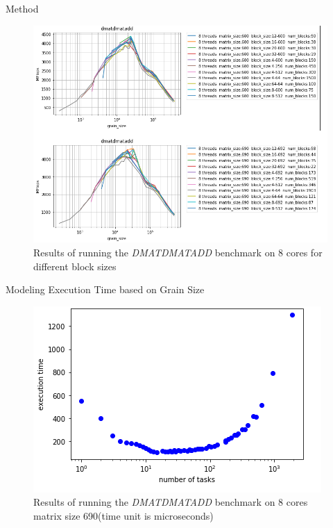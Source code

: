 \documentclass[10pt]{beamer}
\begin{document}
\begin{frame}{Method}
	\begin{outline}
			\begin{figure}
			\includegraphics[width=0.9\linewidth]{figures/mflop_2.png}	
			\caption{Results of running the \textit{DMATDMATADD} benchmark on 8 cores for different block sizes}	
		\end{figure}
	\end{outline}
\end{frame}

\begin{frame}{Modeling Execution Time based on Grain Size}
	\begin{outline}
		\begin{figure}
			\includegraphics[width=0.9\linewidth]{figures/true_1.png}	
			\caption{Results of running the \textit{DMATDMATADD} benchmark on 8 cores matrix size 690(time unit is microseconds)}	
		\end{figure}
	\end{outline}
\end{frame}
\end{document}
